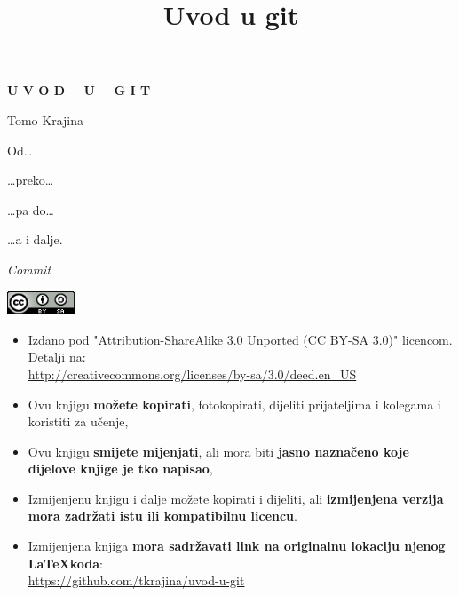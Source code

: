 \documentclass[11pt,twoside,a4paper]{report}
\title{Uvod u git}
\begin{document}
\begin{titlepage}
	\vspace*{1cm}

	\begin{center}
		\Huge \textbf{U V O D \ \ U \ \ G I T}
	\end{center}
	\begin{center}
        Tomo Krajina
	\end{center}

	\vspace*{0.5cm}

	Od\dots

	

	\dots{}preko\dots

	

	\dots{}pa do\dots

	

	\dots{}a i dalje.

	\vspace*{1cm}

	\begin{center}
		\emph{Commit}
		
	\end{center}

\end{titlepage}

\pagestyle{empty}

\vspace*{4cm}

\begin{center}
    \includegraphics[width=2cm]{images/cc-88x31.png}
\end{center}

\begin{itemize}
    \item Izdano pod "Attribution-ShareAlike 3.0 Unported (CC BY-SA 3.0)" licencom. Detalji na: \\ \url{http://creativecommons.org/licenses/by-sa/3.0/deed.en_US}
    \item Ovu knjigu \textbf{možete kopirati}, fotokopirati, dijeliti prijateljima i kolegama i koristiti za učenje,
    \item Ovu knjigu \textbf{smijete mijenjati}, ali mora biti \textbf{jasno naznačeno koje dijelove knjige je tko napisao},
    \item Izmijenjenu knjigu i dalje možete kopirati i dijeliti, ali \textbf{izmijenjena verzija mora zadržati istu ili kompatibilnu licencu}.
    \item Izmijenjena knjiga \textbf{mora sadržavati link na originalnu lokaciju njenog \LaTeX koda}: \\ \url{https://github.com/tkrajina/uvod-u-git}
\end{itemize}
\end{document}
